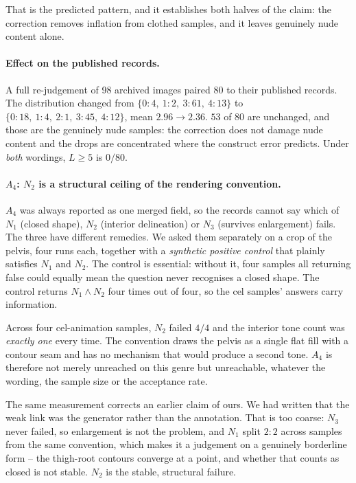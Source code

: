 \documentclass[11pt]{article}
\begin{document}
That is the predicted pattern, and it establishes both halves of the claim: the
correction removes inflation from clothed samples, and it leaves genuinely nude
content alone.

\paragraph{Effect on the published records.}
A full re-judgement of 98 archived images paired 80 to their published records. The distribution changed from $\{0{:}4,\ 1{:}2,\ 3{:}61,\ 4{:}13\}$ to $\{0{:}18,\ 1{:}4,\ 2{:}1,\ 3{:}45,\ 4{:}12\}$, mean $2.96 \to 2.36$. $53$ of $80$ are unchanged, and those are the genuinely nude samples: the correction does not damage nude content and the drops are concentrated where the construct error predicts. Under \emph{both} wordings, $L \ge 5$ is $0/80$.

\paragraph{$A_4$: $N_2$ is a structural ceiling of the rendering convention.}
$A_4$ was always reported as one merged field, so the records cannot say which of $N_1$ (closed shape), $N_2$ (interior delineation) or $N_3$ (survives enlargement) fails. The three have different remedies. We asked them separately on a crop of the pelvis, four runs each, together with a \emph{synthetic positive control} that plainly satisfies $N_1$ and $N_2$. The control is essential: without it, four samples all returning false could equally mean the question never recognises a closed shape. The control returns $N_1 \wedge N_2$ four times out of four, so the cel samples' answers carry information.

Across four cel-animation samples, $N_2$ failed $4/4$ and the interior tone count was \emph{exactly one} every time. The convention draws the pelvis as a single flat fill with a contour seam and has no mechanism that would produce a second tone. $A_4$ is therefore not merely unreached on this genre but unreachable, whatever the wording, the sample size or the acceptance rate.

The same measurement corrects an earlier claim of ours. We had written that the weak link was the generator rather than the annotation. That is too coarse: $N_3$ never failed, so enlargement is not the problem, and $N_1$ split $2{:}2$ across samples from the same convention, which makes it a judgement on a genuinely borderline form -- the thigh-root contours converge at a point, and whether that counts as closed is not stable. $N_2$ is the stable, structural failure.
\end{document}
